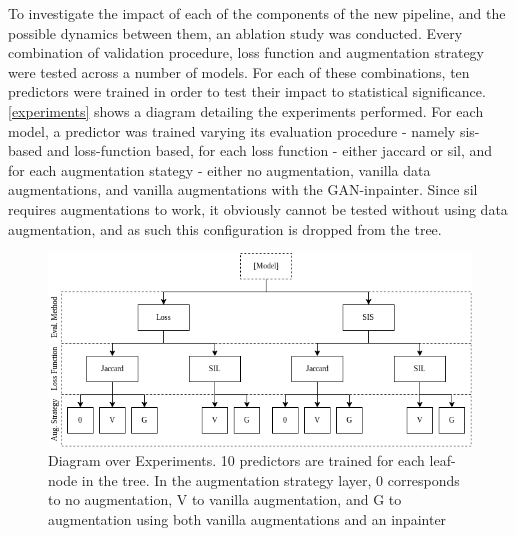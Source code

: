     
        
        
        
        To investigate the impact of each of the components of the new pipeline, and the possible dynamics between them, an ablation study was conducted. Every combination of validation procedure, loss function and augmentation strategy were tested across a number of models. For each of these combinations, ten predictors were trained in order to test their impact to statistical significance. \autoref{experiments} shows a diagram detailing the experiments performed. For each model, a predictor was trained varying its evaluation procedure - namely \gls{sis}-based and loss-function based, for each loss function - either jaccard or \gls{sil}, and for each augmentation stategy - either no augmentation, vanilla data augmentations, and vanilla augmentations with the GAN-inpainter. Since \gls{sil} requires augmentations to work, it obviously cannot be tested without using data augmentation, and as such this configuration is dropped from the tree.

\begin{figure}[h]
    \centering
    \includegraphics[width=\linewidth]{illustrations/experiment.png}
    \caption{Diagram over Experiments. 10 predictors are trained for each leaf-node in the tree. In the augmentation strategy layer, 0 corresponds to no augmentation, V to vanilla augmentation, and G to augmentation using both vanilla augmentations and an inpainter}
    \label{fig:experiments}
\end{figure} 

